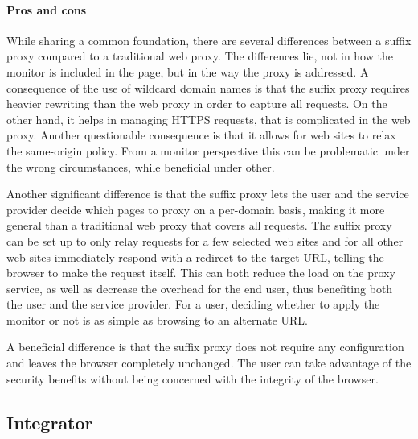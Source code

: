 \documentclass{llncs}
\newcommand{\todo}[1]{\colorbox{red}{\textcolor{white}{\sffamily\bfseries\scriptsize TODO}} \textcolor{red}{#1} \textcolor{red}{$\blacktriangleleft$}}
\begin{document}
\paragraph{Pros and cons}

While sharing a common foundation, there are several differences between a 
suffix proxy compared to a traditional web proxy. The differences lie, not in 
how the monitor is included in the page, but in the way the proxy is 
addressed. A consequence of the use of wildcard domain names is that the suffix proxy requires 
heavier rewriting than the web proxy in order to capture all requests. On the other 
hand, it helps in managing HTTPS requests, that is complicated in the web proxy.
Another questionable consequence is that it allows for web sites to relax the 
same-origin policy. 
From a monitor perspective this can be problematic under the wrong circumstances, 
while beneficial under other.

Another significant difference is that the suffix proxy lets the user and the 
service provider decide which pages to proxy on a per-domain basis, making it 
more general than a traditional web proxy that covers all requests. 
The suffix proxy can be set up to only relay requests for a few selected 
web sites and for all other web sites immediately respond with a redirect to the target
URL, telling the browser to make the request itself. This can both reduce the load on the proxy service, as well as decrease the 
overhead for the end user, thus benefiting both the user and the service provider.
For a user, deciding whether to apply the monitor or not is as simple as browsing 
to an alternate URL.

A beneficial difference is that the suffix proxy does not require any 
configuration and leaves the browser completely unchanged. The user can take
advantage of the security benefits without being concerned with the integrity 
of the browser.

\subsection{Integrator}
\label{sec:arch-integrator}
\end{document}
